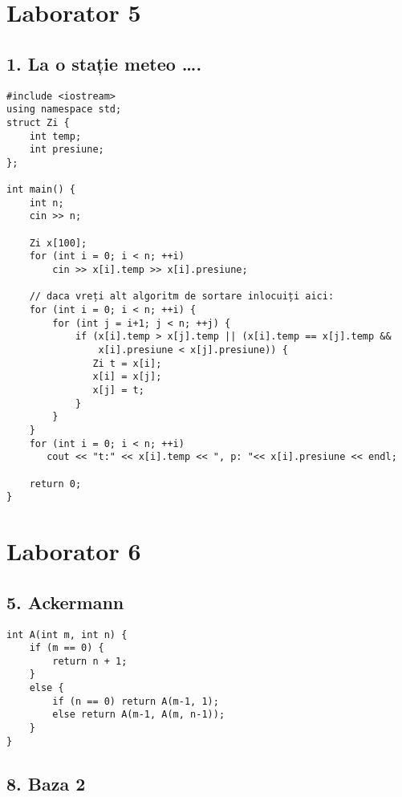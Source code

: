 \documentclass[11pt]{article}
\begin{document}
\pagebreak

\section*{Laborator 5}
\label{sec:orgee9a64e}
\subsection*{1. La o stație meteo \ldots{}.}
\label{sec:org2fe8db7}
\begin{verbatim}
#include <iostream>
using namespace std;
struct Zi {
    int temp;
    int presiune;
};

int main() {
    int n;
    cin >> n;

    Zi x[100];
    for (int i = 0; i < n; ++i)
        cin >> x[i].temp >> x[i].presiune;

    // daca vreți alt algoritm de sortare inlocuiți aici:
    for (int i = 0; i < n; ++i) {
        for (int j = i+1; j < n; ++j) {
            if (x[i].temp > x[j].temp || (x[i].temp == x[j].temp &&
                x[i].presiune < x[j].presiune)) {
               Zi t = x[i];
               x[i] = x[j];
               x[j] = t;
            }
        }
    }
    for (int i = 0; i < n; ++i)
       cout << "t:" << x[i].temp << ", p: "<< x[i].presiune << endl;

    return 0;
}
\end{verbatim}
\pagebreak

\section*{Laborator 6}
\label{sec:orgac7055f}
\subsection*{5. Ackermann}
\label{sec:org6365d13}
\begin{verbatim}
int A(int m, int n) {
    if (m == 0) {
        return n + 1;
    }
    else {
        if (n == 0) return A(m-1, 1);
        else return A(m-1, A(m, n-1));
    }
}
\end{verbatim}

\subsection*{8. Baza 2}
\label{sec:org0a4380a}
\end{document}
